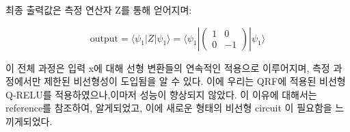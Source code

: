 최종 출력값은 측정 연산자 Z를 통해 얻어지며:

\[
\text{output} = \langle\psi_1|Z|\psi_1\rangle = \langle\psi_1|\begin{pmatrix} 1 & 0 \\ 0 & -1 \end{pmatrix}|\psi_1\rangle
\]

이 전체 과정은 입력 x에 대해 선형 변환들의 연속적인 적용으로 이루어지며, 측정 과정에서만 제한된 비선형성이 도입됨을 알 수 있다. 이에 우리는 QRF에 적용된 비선형 Q-RELU를 적용하였으나,이마저 성능이 향상되지 않았다. 이 이유에 대해서는 reference를 참조하여,
알게되었고, 이에 새로운 형태의 비선형 circuit 이 필요함을 느끼게되었다.






